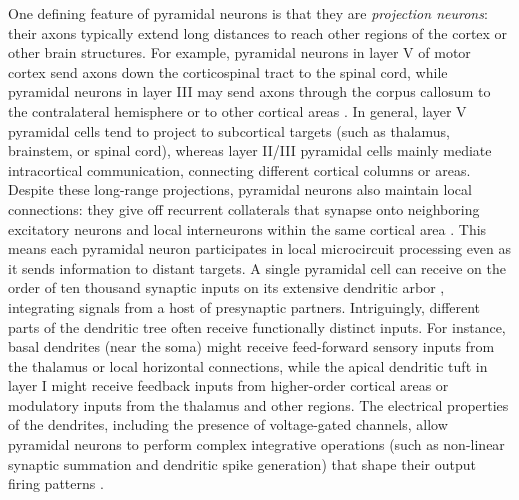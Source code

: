 \documentclass[final, a4paper,masters,en,listoffigures,listoftables,norwegiandates]{NMBU}
\begin{document}
One defining feature of pyramidal neurons is that they are \textit{projection neurons}: their axons typically extend long distances to reach other regions of the cortex or other brain structures. For example, pyramidal neurons in layer V of motor cortex send axons down the corticospinal tract to the spinal cord, while pyramidal neurons in layer III may send axons through the corpus callosum to the contralateral hemisphere or to other cortical areas \cite{kandel2021principles}. In general, layer V pyramidal cells tend to project to subcortical targets (such as thalamus, brainstem, or spinal cord), whereas layer II/III pyramidal cells mainly mediate intracortical communication, connecting different cortical columns or areas. Despite these long-range projections, pyramidal neurons also maintain local connections: they give off recurrent collaterals that synapse onto neighboring excitatory neurons and local interneurons within the same cortical area \cite{Harris2015}. This means each pyramidal neuron participates in local microcircuit processing even as it sends information to distant targets. A single pyramidal cell can receive on the order of ten thousand synaptic inputs on its extensive dendritic arbor \cite{Spruston2008,Dayan2001}, integrating signals from a host of presynaptic partners. Intriguingly, different parts of the dendritic tree often receive functionally distinct inputs. For instance, basal dendrites (near the soma) might receive feed-forward sensory inputs from the thalamus or local horizontal connections, while the apical dendritic tuft in layer I might receive feedback inputs from higher-order cortical areas or modulatory inputs from the thalamus and other regions. The electrical properties of the dendrites, including the presence of voltage-gated channels, allow pyramidal neurons to perform complex integrative operations (such as non-linear synaptic summation and dendritic spike generation) that shape their output firing patterns \cite{Spruston2008}.
\end{document}
